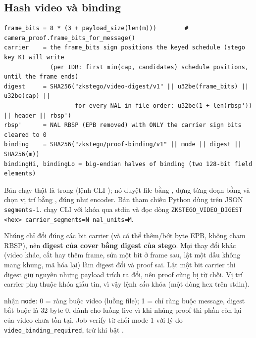 \documentclass[11pt,a4paper]{article}
\begin{document}
\subsection{Hash video và binding}

\begin{lstlisting}[numbers=none]
frame_bits = 8 * (3 + payload_size(len(m)))        # camera_proof.frame_bits_for_message()
carrier    = the frame_bits sign positions the keyed schedule (stego key K) will write
             (per IDR: first min(cap, candidates) schedule positions, until the frame ends)
digest     = SHA256("zkstego/video-digest/v1" || u32be(frame_bits) || u32be(cap) ||
                    for every NAL in file order: u32be(1 + len(rbsp')) || header || rbsp')
rbsp'      = NAL RBSP (EPB removed) with ONLY the carrier sign bits cleared to 0
binding    = SHA256("zkstego/proof-binding/v1" || mode || digest || SHA256(m))
bindingHi, bindingLo = big-endian halves of binding (two 128-bit field elements)
\end{lstlisting}

Bản chạy thật là  trong
 (lệnh CLI ); nó duyệt file bằng
, dựng từng đoạn bằng 
và chọn vị trí bằng , đúng như encoder. Bản tham chiếu
Python  dùng  trên JSON
\texttt{segments-1}.  chạy CLI với khóa qua stdin và đọc dòng
\texttt{ZKSTEGO\_VIDEO\_DIGEST <hex> carrier\_segments=N nal\_units=M}.

Nhúng chỉ đổi đúng các bit carrier (và có thể thêm/bớt byte EPB, không chạm RBSP), nên
\textbf{digest của cover bằng digest của stego}. Mọi thay đổi khác (video khác, cắt hay
thêm frame, sửa một bit ở frame sau, lật một dấu không mang khung, mã hóa lại) làm digest
đổi và proof sai. Lật một bit carrier thì digest giữ nguyên nhưng payload trích ra đổi,
nên proof cũng bị từ chối. Vị trí carrier phụ thuộc khóa giấu tin, vì vậy lệnh
 \emph{cần} khóa (một dòng hex trên stdin).

 nhận \texttt{mode}: 0 = ràng buộc video (luồng file); 1 = chỉ
ràng buộc message, digest bắt buộc là 32 byte 0, dành cho luồng live vì khi nhúng proof
thì phần còn lại của video chưa tồn tại. Job verify từ chối mode 1 với lý do
\texttt{video\_binding\_required}, trừ khi bật .
\end{document}
